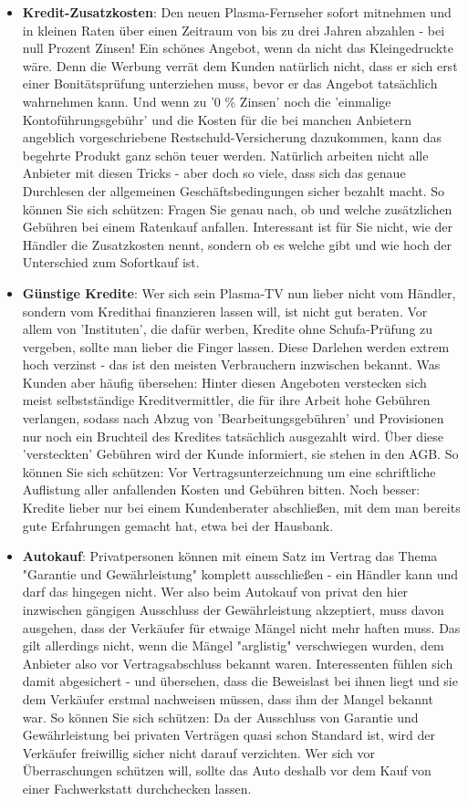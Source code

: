 \documentclass[a4paper]{article}
\begin{document}
\begin{itemize}
\item \textbf{Kredit-Zusatzkosten}: Den neuen Plasma-Fernseher sofort mitnehmen und in kleinen Raten über einen Zeitraum von bis zu drei Jahren abzahlen - bei null Prozent Zinsen! Ein schönes Angebot, wenn da nicht das Kleingedruckte wäre. Denn die Werbung verrät dem Kunden natürlich nicht, dass er sich erst einer Bonitätsprüfung unterziehen muss, bevor er das Angebot tatsächlich wahrnehmen kann. Und wenn zu '0 \% Zinsen' noch die 'einmalige Kontoführungsgebühr' und die Kosten für die bei manchen Anbietern angeblich vorgeschriebene Restschuld-Versicherung dazukommen, kann das begehrte Produkt ganz schön teuer werden. Natürlich arbeiten nicht alle Anbieter mit diesen Tricks - aber doch so viele, dass sich das genaue Durchlesen der allgemeinen Geschäftsbedingungen sicher bezahlt macht. So können Sie sich schützen: Fragen Sie genau nach, ob und welche zusätzlichen Gebühren bei einem Ratenkauf anfallen. Interessant ist für Sie nicht, wie der Händler die Zusatzkosten nennt, sondern ob es welche gibt und wie hoch der Unterschied zum Sofortkauf ist.

\item \textbf{Günstige Kredite}: Wer sich sein Plasma-TV nun lieber nicht vom Händler, sondern vom Kredithai finanzieren lassen will, ist nicht gut beraten. Vor allem von 'Instituten', die dafür werben, Kredite ohne Schufa-Prüfung zu vergeben, sollte man lieber die Finger lassen. Diese Darlehen werden extrem hoch verzinst - das ist den meisten Verbrauchern inzwischen bekannt. Was Kunden aber häufig übersehen: Hinter diesen Angeboten verstecken sich meist selbstständige Kreditvermittler, die für ihre Arbeit hohe Gebühren verlangen, sodass nach Abzug von 'Bearbeitungsgebühren' und Provisionen nur noch ein Bruchteil des Kredites tatsächlich ausgezahlt wird. Über diese 'versteckten' Gebühren wird der Kunde informiert, sie stehen in den AGB. So können Sie sich schützen: Vor Vertragsunterzeichnung um eine schriftliche Auflistung aller anfallenden Kosten und Gebühren bitten. Noch besser: Kredite lieber nur bei einem Kundenberater abschließen, mit dem man bereits gute Erfahrungen gemacht hat, etwa bei der Hausbank.

\item \textbf{Autokauf}: Privatpersonen können mit einem Satz im Vertrag das Thema "Garantie und Gewährleistung" komplett ausschließen - ein Händler kann und darf das hingegen nicht. Wer also beim Autokauf von privat den hier inzwischen gängigen Ausschluss der Gewährleistung akzeptiert, muss davon ausgehen, dass der Verkäufer für etwaige Mängel nicht mehr haften muss. Das gilt allerdings nicht, wenn die Mängel "arglistig" verschwiegen wurden, dem Anbieter also vor Vertragsabschluss bekannt waren. Interessenten fühlen sich damit abgesichert - und übersehen, dass die Beweislast bei ihnen liegt und sie dem Verkäufer erstmal nachweisen müssen, dass ihm der Mangel bekannt war. So können Sie sich schützen: Da der Ausschluss von Garantie und Gewährleistung bei privaten Verträgen quasi schon Standard ist, wird der Verkäufer freiwillig sicher nicht darauf verzichten. Wer sich vor Überraschungen schützen will, sollte das Auto deshalb vor dem Kauf von einer Fachwerkstatt durchchecken lassen.


\end{itemize}
\end{document}
